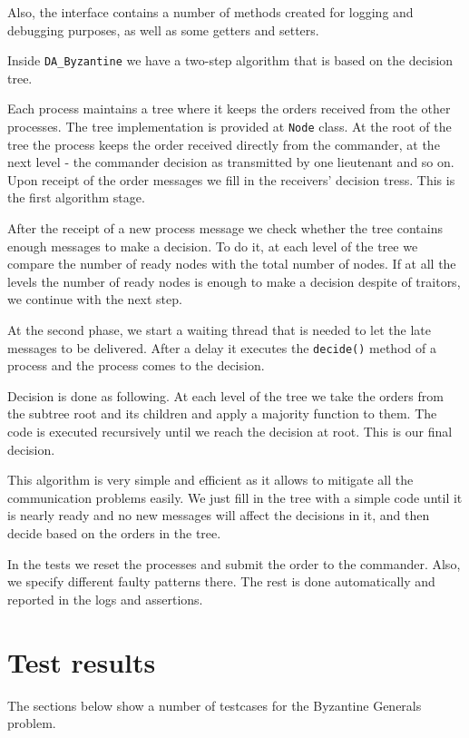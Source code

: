 \documentclass[a4paper, notitlepage]{article}
\begin{document}
Also, the interface contains a number of methods created for logging and debugging purposes, as well as some getters and setters.

Inside \lstinline{DA_Byzantine} we have a two-step algorithm that is based on the decision tree.

Each process maintains a tree where it keeps the orders received from the other processes. The tree implementation is provided at \lstinline{Node} class. At the root of the tree the process keeps the order received directly from the commander, at the next level - the commander decision as transmitted by one lieutenant and so on. Upon receipt of the order messages we fill in the receivers' decision tress. This is the first algorithm stage.

After the receipt of a new process message we check whether the tree contains enough messages to make a decision. To do it, at each level of the tree we compare the number of ready nodes with the total number of nodes. If at all the levels the number of ready nodes is enough to make a decision despite of traitors, we continue with the next step.

At the second phase, we start a waiting thread that is needed to let the late messages to be delivered. After a delay it executes the \lstinline{decide()} method of a process and the process comes to the decision. 

Decision is done as following. At each level of the tree we take the orders from the subtree root and its children and apply a majority function to them. The code is executed recursively until we reach the decision at root. This is our final decision.

This algorithm is very simple and efficient as it allows to mitigate all the communication problems easily. We just fill in the tree with a simple code until it is nearly ready and no new messages will affect the decisions in it, and then decide based on the orders in the tree.

In the tests we reset the processes and submit the order to the commander. Also, we specify different faulty patterns there. The rest is done automatically and reported in the logs and assertions.

\section{Test results}

The sections below show a number of testcases for the Byzantine Generals problem.
\end{document}
